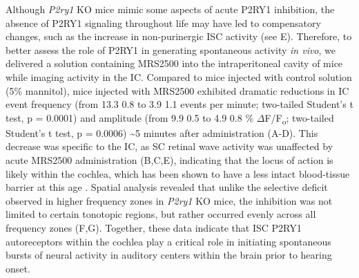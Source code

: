 \documentclass[9pt,lineno]{elife}
\begin{document}
Although \textit{P2ry1} KO mice mimic some aspects of acute P2RY1 inhibition, the absence of P2RY1 signaling throughout life may have led to compensatory changes, such as the increase in non-purinergic ISC activity (see E). Therefore, to better assess the role of P2RY1 in generating spontaneous activity \textit{in vivo}, we delivered a solution containing MRS2500 into the intraperitoneal cavity of mice while imaging activity in the IC. Compared to mice injected with control solution (5\% mannitol), mice injected with MRS2500 exhibited dramatic reductions in IC event frequency (from 13.3 \textpm \hspace{0.2 mm} 0.8 to 3.9 \textpm \hspace{0.2 mm} 1.1 events per minute; two-tailed Student’s t test, p = 0.0001) and amplitude (from 9.9 \textpm \hspace{0.2 mm} 0.5 to 4.9 \textpm \hspace{0.2 mm} 0.8 \% $\Delta$F/F\textsubscript{o}; two-tailed Student’s t test, p = 0.0006) \textasciitilde 5 minutes after administration (A-D). This decrease was specific to the IC, as SC retinal wave activity \citep{Ackman2012} was unaffected by acute MRS2500 administration (B,C,E), indicating that the locus of action is likely within the cochlea, which has been shown to have a less intact blood-tissue barrier at this age \citep{Suzuki1998}. Spatial analysis revealed that unlike the selective deficit observed in higher frequency zones in \textit{P2ry1} KO mice, the inhibition was not limited to certain tonotopic regions, but rather occurred evenly across all frequency zones (F,G). Together, these data indicate that ISC P2RY1 autoreceptors within the cochlea play a critical role in initiating spontaneous bursts of neural activity in auditory centers within the brain prior to hearing onset.
\end{document}
